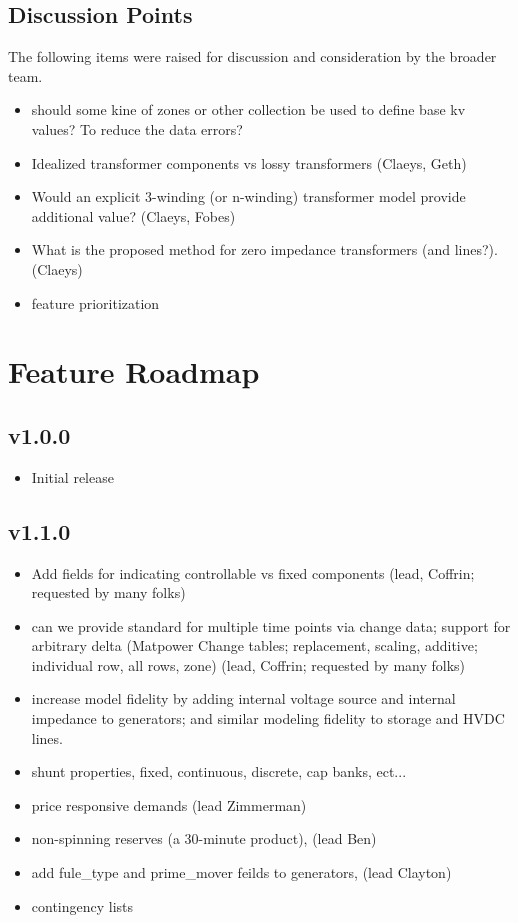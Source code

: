 \documentclass{article}
\begin{document}
\subsection{Discussion Points}
The following items were raised for discussion and consideration by the broader team.
\begin{itemize}
    \item should some kine of zones or other collection be used to define base kv values?  To reduce the data errors?
    \item Idealized transformer components vs lossy transformers (Claeys, Geth)
    \item Would an explicit 3-winding (or n-winding) transformer model provide additional value? (Claeys, Fobes)
    \item What is the proposed method for zero impedance transformers (and lines?). (Claeys)
    \item feature prioritization
\end{itemize}





\clearpage
\appendix

\section{Feature Roadmap}

\subsection{v1.0.0}
\begin{itemize}
    \item Initial release
\end{itemize}


\subsection{v1.1.0}

\begin{itemize}
    \item Add fields for indicating controllable vs fixed components (lead, Coffrin; requested by many folks)
    \item can we provide standard for multiple time points via change data; support for arbitrary delta (Matpower Change tables; replacement, scaling, additive; individual row, all rows, zone) (lead, Coffrin; requested by many folks)
    \item increase model fidelity by adding internal voltage source and internal impedance to generators; and similar modeling fidelity to storage and HVDC lines.
    \item shunt properties, fixed, continuous, discrete, cap banks, ect...
    \item price responsive demands (lead Zimmerman)
    \item non-spinning reserves (a 30-minute product), (lead Ben) 
    \item add fule\_type and prime\_mover feilds to generators, (lead Clayton)
    \item contingency lists
\end{itemize}
\end{document}

